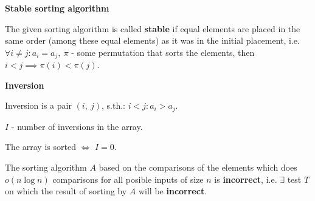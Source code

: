 
\begin{definition}\textbf{Stable sorting algorithm}

    The given sorting algorithm is called \textbf{stable} if equal elements are placed in the same order (among these equal elements) as it was in the initial placement, i.e. $\forall i \neq j: a_i = a_j, \ \pi$ - some permutation that sorts the elements, then $i < j \implies \pi(i) < \pi(j)$.

\end{definition}

\begin{definition}\textbf{Inversion}

    Inversion is a pair $(i, \ j)$, s.th.: $i < j: a_i > a_j$.
\end{definition}

\begin{definition}
    $I$ - number of inversions in the array.
\end{definition}

\begin{definition}
    The array is sorted $\Leftrightarrow$ $I = 0$.
\end{definition}

\begin{lemma}

    The sorting algorithm $A$ based on the comparisons of the elements which does $o(n \log{n})$ comparisons for all posible inputs of size $n$ is \textbf{incorrect}, i.e. $\exists$ test $T$ on which the result of sorting by $A$ will be \textbf{incorrect}.

\end{lemma}

